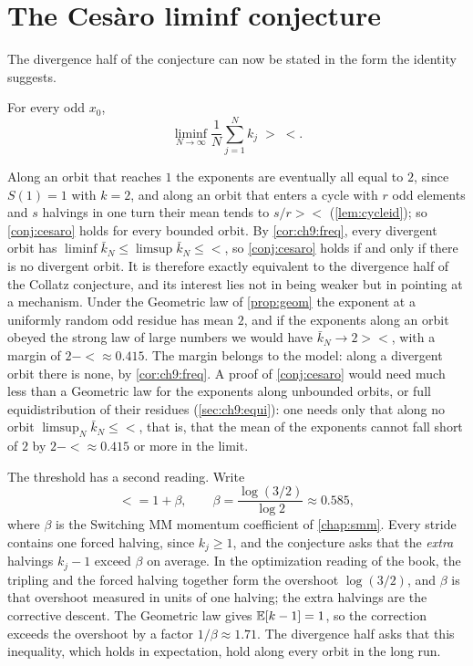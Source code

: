 \section{The Ces\`aro liminf conjecture}\label{sec:ch9:conj}

The divergence half of the conjecture can now be stated in the form the
identity suggests.

\begin{conjecture}\label{conj:cesaro}
For every odd $x_0$,
\[
  \liminf_{N\to\infty}\frac1N\sum_{j=1}^Nk_j\;>\;\lt .
\]
\end{conjecture}

\begin{sloppypar}
Along an orbit that reaches $1$ the exponents are eventually all equal to $2$, since $S(1)=1$ with $k=2$, and along an orbit that enters a cycle with $r$ odd elements and $s$ halvings in one turn their mean tends to $s/r>\lt$ (\cref{lem:cycleid}); so \cref{conj:cesaro} holds for every bounded orbit.
By \cref{cor:ch9:freq}, every divergent orbit has $\liminf\bar k_N\le\limsup\bar k_N\le\lt$, so \cref{conj:cesaro} holds if and only if there is no divergent orbit.
It is therefore exactly equivalent to the divergence half of
the Collatz conjecture, and its interest lies not in being weaker but in
pointing at a mechanism. Under the Geometric law of \cref{prop:geom} the
exponent at a uniformly random odd residue has mean $2$, and if the exponents along an orbit obeyed the strong
law of large numbers we would have $\bar k_N\to2>\lt$, with a margin of
$2-\lt\approx0.415$. The margin belongs to the model: along a divergent orbit there is none, by \cref{cor:ch9:freq}.
A proof of \cref{conj:cesaro} would need much less than a Geometric law for the exponents along unbounded orbits, or full equidistribution of their residues (\cref{sec:ch9:equi}): one needs only that along no orbit $\limsup_N\bar k_N\le\lt$, that is, that the mean of the exponents cannot fall short of $2$ by $2-\lt\approx0.415$ or more in the limit.
\end{sloppypar}

The threshold has a second reading. Write
\[
  \lt=1+\beta,\qquad\beta=\frac{\log(3/2)}{\log2}\approx0.585 ,
\]
where $\beta$ is the Switching MM momentum coefficient of \cref{chap:smm}. Every
stride contains one forced halving, since $k_j\geq1$, and the conjecture
asks that the \emph{extra} halvings $k_j-1$ exceed $\beta$ on average. In the
optimization reading of the book, the tripling and the forced halving together
form the overshoot $\log(3/2)$, and $\beta$ is that overshoot measured in units
of one halving; the extra halvings are the corrective descent. The Geometric
law gives $\mathbb{E}[k-1]=1$, so the correction exceeds the overshoot by a factor
$1/\beta\approx1.71$. The divergence half asks that this inequality, which
holds in expectation, hold along every orbit in the long run.

